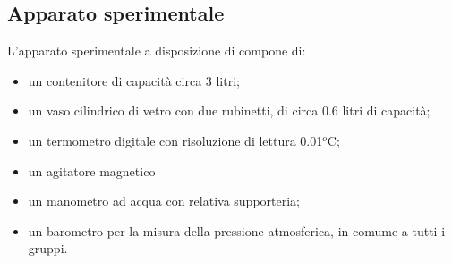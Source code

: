 \subsection{Apparato sperimentale}
L'apparato sperimentale a disposizione di compone di:

\begin{itemize}
	\item{un contenitore di capacità circa 3 litri;}
	\item{un vaso cilindrico di vetro con due rubinetti, di circa 0.6 litri di capacità;}
	\item{un termometro digitale con risoluzione di lettura 0.01$^o$C;}
	\item{un agitatore magnetico}
	\item{un manometro ad acqua con relativa supporteria;}
	\item{un barometro per la misura della pressione atmosferica, in comume a tutti i gruppi.}
\end{itemize}
